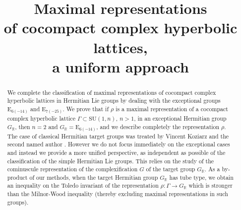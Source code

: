 \documentclass[JEP,XML,SOM,Unicode,NoFloatCountersInSection]{cedram}
\theoremstyle{plain}
\theoremstyle{definition}
\begin{document}
\frontmatter

\title[Maximal representations, a uniform approach]{Maximal representations\\ of cocompact
complex hyperbolic lattices,\\ a uniform approach}

\author[\initial{P.-E.} \lastname{Chaput}]{ }
\address{Institut Élie Cartan de Lorraine,
Université de Lorraine\\
Site de Nancy, B.P. 70239, F-54506 Vandoeuvre-lès-Nancy Cedex}

\author[\initial{J.} \lastname{Maubon}]{ }
\address{Institut Élie Cartan de Lorraine,
Université de Lorraine\\
Site de Nancy, B.P. 70239, F-54506 Vandoeuvre-lès-Nancy Cedex}

\begin{abstract}
We complete the classification of maximal representations of cocompact complex hyperbolic lattices in Hermitian Lie groups by dealing with the exceptional groups $\mathrm{E}_{6(-14)}$ and $\mathrm{E}_{7(-25)}$. We prove that if $\rho$ is a maximal representation of a cocompact complex hyperbolic lattice $\Gamma\subset\mathrm{SU}(1,n)$, $n>1$, in an exceptional Hermitian group $G_\mathbb{R}$, then $n=2$ and $G_\mathbb{R}=\mathrm{E}_{6(-14)}$, and we describe completely the representation $\rho$. The case of classical Hermitian target groups was treated by Vincent Koziarz and the second named author \cite{KM}. However we do not focus immediately on the exceptional cases and instead we provide a more unified perspective, as independent as possible of the classification of the simple Hermitian Lie groups. This relies on the study of the cominuscule representation of the complexification $G$ of the target group $G_\mathbb{R}$. As a by-product of our methods, when the target Hermitian group $G_\mathbb{R}$ has tube type, we obtain an inequality on the Toledo invariant of the representation $\rho:\Gamma\to G_\mathbb{R}$ which is stronger than the Milnor-Wood inequality (thereby excluding maximal representations in such groups).
\end{abstract}

\end{document}
